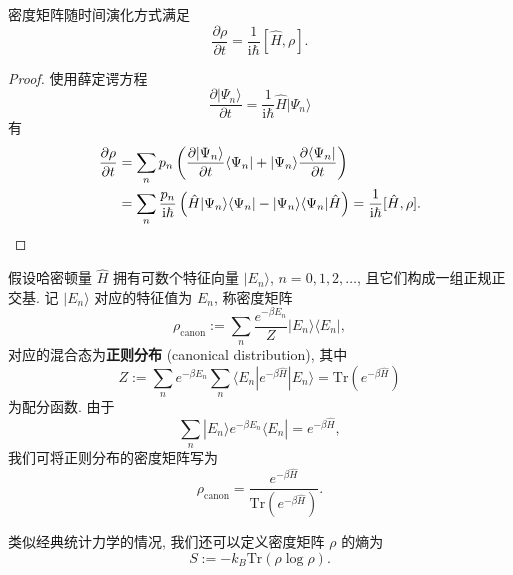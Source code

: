 \begin{proposition}
    密度矩阵随时间演化方式满足
    \[ \frac{\partial\rho}{\partial t}=\frac{1}{\mathrm{i}\hbar}[\hat{H},\rho]. \]
\end{proposition}
\begin{proof}
    使用薛定谔方程
    \[ \frac{\partial| \Psi_n \rangle}{\partial t}=\frac{1}{\mathrm{i}\hbar}\hat{H}| \Psi_n \rangle \]
    有
    \begin{align*}
        \frac{\partial\rho}{\partial t}&=\sum_n p_n\left( \frac{\partial| \Psi_n \rangle}{\partial t}\langle \Psi_n |+| \Psi_n \rangle\frac{\partial\langle \Psi_n |}{\partial t} \right)\\ 
        &=\sum_n \frac{p_n}{\mathrm{i}\hbar}\left( \hat{H}| \Psi_n \rangle\langle \Psi_n |-| \Psi_n \rangle\langle \Psi_n |\hat{H} \right)=\frac{1}{\mathrm{i}\hbar}[\hat{H},\rho].\qedhere
    \end{align*}
\end{proof}

假设哈密顿量 $ \hat{H} $ 拥有可数个特征向量 $ | E_n \rangle $, $ n=0,1,2,\dots $, 且它们构成一组正规正交基. 记 $ | E_n \rangle $ 对应的特征值为 $ E_n $, 称密度矩阵
\[ \rho_{\mathrm{canon}}:=\sum_n\frac{e^{-\beta E_n}}{Z}| E_n \rangle\langle E_n |, \]
对应的混合态为{\bf 正则分布} (canonical distribution), 其中 
\[ Z:=\sum_n e^{-\beta E_n}\sum_n\langle E_n |e^{-\beta \hat{H}}| E_n \rangle=\mathrm{Tr}\left( e^{-\beta \hat{H}} \right) \]
为配分函数. 由于
\[ \sum_n | E_n \rangle e^{-\beta E_n}\langle E_n |=e^{-\beta \hat{H}}, \]
我们可将正则分布的密度矩阵写为
\[ \rho_{\mathrm{canon}}=\frac{e^{-\beta\hat{H}}}{\mathrm{Tr}\left( e^{-\beta\hat{H}} \right)}. \]

类似经典统计力学的情况, 我们还可以定义密度矩阵 $ \rho $ 的熵为 
\[ S:=-k_B\mathrm{Tr}(\rho\log\rho). \]

